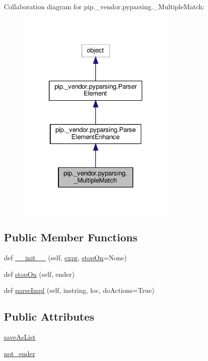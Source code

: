 Collaboration diagram for pip.\+\_\+vendor.\+pyparsing.\+\_\+\+Multiple\+Match\+:
\nopagebreak
\begin{figure}[H]
\begin{center}
\leavevmode
\includegraphics[width=223pt]{classpip_1_1__vendor_1_1pyparsing_1_1__MultipleMatch__coll__graph}
\end{center}
\end{figure}
\subsection*{Public Member Functions}
\begin{DoxyCompactItemize}
\item 
def \hyperlink{classpip_1_1__vendor_1_1pyparsing_1_1__MultipleMatch_ae3432da50d0f3af18b67f471f0ae430e}{\+\_\+\+\_\+init\+\_\+\+\_\+} (self, \hyperlink{classpip_1_1__vendor_1_1pyparsing_1_1ParseElementEnhance_af574b49a0a7d914693fdaa833df7098f}{expr}, \hyperlink{classpip_1_1__vendor_1_1pyparsing_1_1__MultipleMatch_a5a7b5259d96f04d1ffbc448715239798}{stop\+On}=None)
\item 
def \hyperlink{classpip_1_1__vendor_1_1pyparsing_1_1__MultipleMatch_a5a7b5259d96f04d1ffbc448715239798}{stop\+On} (self, ender)
\item 
def \hyperlink{classpip_1_1__vendor_1_1pyparsing_1_1__MultipleMatch_aedccc5e8b3d7d55a0410a161fc4876c8}{parse\+Impl} (self, instring, loc, do\+Actions=True)
\end{DoxyCompactItemize}
\subsection*{Public Attributes}
\begin{DoxyCompactItemize}
\item 
\hyperlink{classpip_1_1__vendor_1_1pyparsing_1_1__MultipleMatch_ac8bf2b6a1a731fa029908aa1261f8593}{save\+As\+List}
\item 
\hyperlink{classpip_1_1__vendor_1_1pyparsing_1_1__MultipleMatch_a4dc8797297085e6bbdebcabf2dc2ac24}{not\+\_\+ender}
\end{DoxyCompactItemize}
